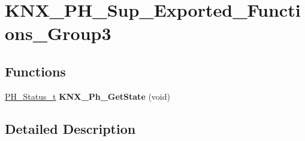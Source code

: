 \hypertarget{group___k_n_x___p_h___sup___exported___functions___group3}{}\section{K\+N\+X\+\_\+\+P\+H\+\_\+\+Sup\+\_\+\+Exported\+\_\+\+Functions\+\_\+\+Group3}
\label{group___k_n_x___p_h___sup___exported___functions___group3}
\subsection*{Functions}
\begin{DoxyCompactItemize}
\item 
\hyperlink{group___k_n_x___p_h___sup___exported___types_ga5b665a94bef912fbfbea7cc949ed0e49}{P\+H\+\_\+\+Status\+\_\+t} {\bfseries K\+N\+X\+\_\+\+Ph\+\_\+\+Get\+State} (void)\hypertarget{group___k_n_x___p_h___sup___exported___functions___group3_ga8f380db7e1c156190263c4860f2d3ded}{}\label{group___k_n_x___p_h___sup___exported___functions___group3_ga8f380db7e1c156190263c4860f2d3ded}

\end{DoxyCompactItemize}


\subsection{Detailed Description}

